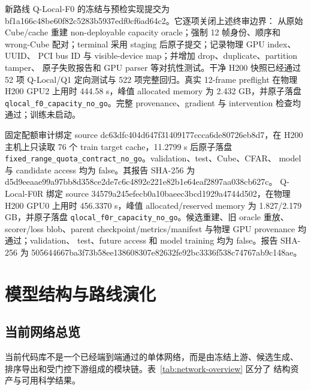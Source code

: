 \documentclass[11pt,a4paper,fontset=none]{ctexart}
\newcommand{\code}[1]{\texttt{#1}}
\newcommand{\hash}[2]{{\small\ttfamily #1\allowbreak{}#2}}
\begin{document}
新路线 Q-Local-F0 的冻结与预检实现提交为
\hash{bf1a166c48be60f82c5283b5937edf0c}{f6ad64c2}。它逐项关闭上述终审边界：
从原始 Cube/cache 重建 non-deployable capacity oracle；强制 12 帧身份、顺序和
wrong-Cube 配对；terminal 采用 staging 后原子提交；记录物理 GPU index、UUID、
PCI bus ID 与 visible-device map；并增加 drop、duplicate、partition tamper、
原子失败报告和 GPU parser 等对抗性测试。干净 H200 快照已经通过
52 项 Q-Local/Q1 定向测试与 522 项完整回归。真实 12-frame preflight 在物理
H200 GPU2 上用时 444.58 s，峰值 allocated memory 为 2.432 GB，并原子落盘
\code{qlocal\_f0\_capacity\_no\_go}。完整 provenance、gradient 与 intervention
检查均通过；训练未启动。

固定配额审计绑定 source
\hash{dc63dfc404d647f31409177ccca6de80}{726eb8d7}，在 H200 主机上只读取
76 个 train target cache，11.2799 s 后原子落盘
\code{fixed\_range\_quota\_contract\_no\_go}。validation、test、Cube、CFAR、
model 与 candidate access 均为 false。其报告 SHA-256 为
\hash{d5d9eeaae99a97bb8d358ce2de7c6c48}{92e221e82b1e64eaf2897aa038cb627c}。
Q-Local-F0R 绑定 source
\hash{34579a245efecb0a10baeec3bcd1929a}{4744d502}，在物理 H200 GPU0 上用时
456.3370 s，峰值 allocated/reserved memory 为 1.827/2.179 GB，并原子落盘
\code{qlocal\_f0r\_capacity\_no\_go}。候选重建、旧 oracle 重放、scorer/loss
blob、parent checkpoint/metrics/manifest 与物理 GPU provenance 均通过；validation、
test、future access 和 model training 均为 false。报告 SHA-256 为
\hash{505644667ba3f73b58ee138608307e826}{32fe92bc3336f538c74767ab9c148ae}。

\section{模型结构与路线演化}

\subsection{当前网络总览}

当前代码库不是一个已经端到端通过的单体网络，而是由冻结上游、候选生成、
排序导出和受门控下游组成的模块链。表~\ref{tab:network-overview} 区分了
结构资产与可用科学结果。
\end{document}
